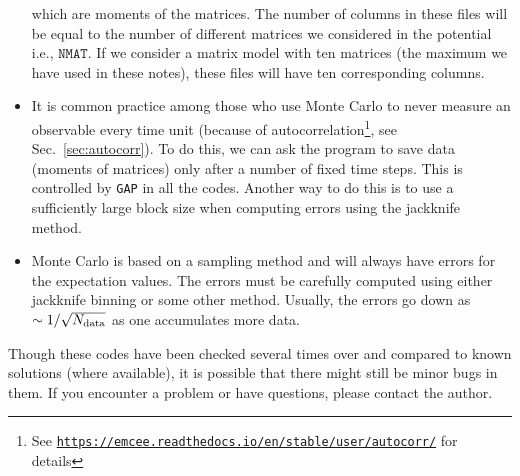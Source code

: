 \documentclass[letter,11pt]{article}
\begin{document}
\begin{itemize}
which are moments of the matrices. The number of columns in these files will be equal to 
the number of different matrices we considered in the potential i.e., $\texttt{NMAT}$. 
If we consider a matrix model with ten matrices (the maximum we have used in these notes),
these files will have ten corresponding columns. 
\item It is common practice among those who use Monte Carlo to never measure an 
observable every time unit (because of autocorrelation\footnote{See 
\texttt{\href{https://emcee.readthedocs.io/en/stable/user/autocorr/}{https://emcee.readthedocs.io/en/stable/user/autocorr/}}
for details}, see Sec.~\ref{sec:autocorr}). 
To do this, we can ask the program to save data (moments of matrices) only after a number of fixed time steps. This is controlled by \texttt{GAP} in all the codes. Another way to do this is to use a sufficiently large block size when computing errors using the jackknife method. 
\item Monte Carlo is based on a sampling method and will always have errors for the expectation values. The errors must be carefully computed using either jackknife binning or some other method. Usually, the errors go down as $ \sim 1/\sqrt{N_{\rm{data}}}$ as one accumulates more data. 
\end{itemize} 
Though these codes have been checked several times over and compared to known solutions (where available), it is possible that there might still be minor bugs in them. If you encounter a problem or have questions, please contact the author. 
\vspace{8mm}
\end{document}
